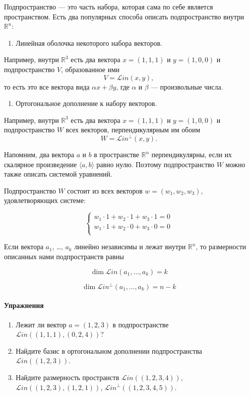 \documentclass[11pt,russian,]{article}
\providecommand{\tightlist}{%
  \setlength{\itemsep}{0pt}\setlength{\parskip}{0pt}}
\let\oldparagraph\paragraph
\renewcommand{\paragraph}[1]{\oldparagraph{#1}\mbox{}}
\newcommand{\RR}{\mathbb{R}}
\renewcommand{\Rn}{\RR^n}
\newcommand{\1}{\mathbbm{1}}
\newcommand{\Lin}{\mathcal{L}in}
\newcommand{\Linp}{\Lin^{\perp}}
\begin{document}
Подпространство --- это часть набора, которая сама по себе является
пространством. Есть два популярных способа описать подпространство
внутри \(\Rn\):

\begin{enumerate}
\def\labelenumi{\arabic{enumi}.}
\tightlist
\item
  Линейная оболочка некоторого набора векторов.
\end{enumerate}

Например, внутри \(\RR^{3}\) есть два вектора \(x = (1, 1, 1)\) и
\(y = (1, 0, 0)\) и подпространство \(V\), образованное ими \[
V = \Lin (x, y),
\] то есть это все вектора вида \(\alpha x + \beta y\), где \(\alpha\) и
\(\beta\) --- произвольные числа.

\begin{enumerate}
\def\labelenumi{\arabic{enumi}.}
\setcounter{enumi}{1}
\tightlist
\item
  Ортогональное дополнение к набору векторов.
\end{enumerate}

Например, внутри \(\RR^{3}\) есть два вектора \(x = (1, 1, 1)\) и
\(y = (1, 0, 0)\) и подпространство \(W\) всех векторов,
перпендикулярным им обоим \[
W = \Linp (x, y).
\]

Напомним, два вектора \(a\) и \(b\) в пространстве \(\Rn\)
перпендикулярны, если их скалярное произведение \(\langle a, b \rangle\)
равно нулю. Поэтому подпространство \(W\) можно также описать системой
уравнений.

Подпространство \(W\) состоит из всех векторов \(w=(w_1, w_2, w_3)\),
удовлетворяющих системе:

\[
\begin{cases}
w_1 \cdot 1 + w_2 \cdot 1 + w_3 \cdot 1 = 0 \\
w_1 \cdot 1 + w_2 \cdot 0 + w_3 \cdot 0 = 0 \\
\end{cases}
\]

Если вектора \(a_1\), \ldots, \(a_k\) линейно независимы и лежат внутри
\(\Rn\), то размерности описанных нами подпространств равны

\[
\dim \Lin(a_1, \ldots, a_k) = k
\]

\[
\dim \Linp(a_1, \ldots, a_k) =  n - k
\]

\paragraph{Упражнения}

\begin{enumerate}
\def\labelenumi{\arabic{enumi}.}
\item
  Лежит ли вектор \(a=(1,2,3)\) в подпространстве
  \(\Lin((1,1,1), (0, 2, 4))\)?
\item
  Найдите базис в ортогональном дополнении подпространства
  \(\Lin((1, 2, 3))\).
\item
  Найдите размерность пространств \(\Lin((1, 2, 3, 4))\),
  \(\Lin((1, 2, 3), (1, 2, 1))\), \(\Linp((1, 2, 3, 4, 5))\).
\end{enumerate}
\end{document}
